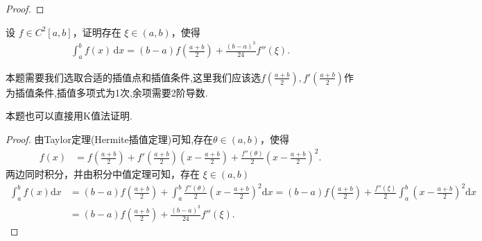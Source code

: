 \documentclass[../../main.tex]{subfiles}%
\begin{document}
\begin{proof}
\end{proof}

\begin{example}
设 $f \in C^2[a, b]$，证明存在 $\xi \in (a, b)$，使得
\begin{align*}
\int_a^b f(x) \, \mathrm{d}x = (b - a) f \left( \frac{a + b}{2} \right) + \frac{(b - a)^3}{24} f''(\xi).
\end{align*}
\end{example}
\begin{note}
本题需要我们选取合适的插值点和插值条件,这里我们应该选$f(\frac{a+b}{2}),f'(\frac{a+b}{2})$作为插值条件,插值多项式为1次,余项需要2阶导数.
\end{note}
\begin{remark}
本题也可以直接用K值法证明.
\end{remark}
\begin{proof}

由Taylor定理(Hermite插值定理)可知,存在$\theta \in \left( a,b \right)$，使得
\begin{align*}
f\left( x \right) &= f\left( \frac{a+b}{2} \right) + f'\left( \frac{a+b}{2} \right) \left( x - \frac{a+b}{2} \right) + \frac{f'' \left( \theta \right)}{2}\left( x - \frac{a+b}{2} \right)^2.
\end{align*}
两边同时积分，并由积分中值定理可知，存在 $\xi \in \left( a,b \right)$
\begin{align*}
\int_a^b{f\left( x \right) \mathrm{d}x} &= \left( b-a \right) f\left( \frac{a+b}{2} \right) + \int_a^b{\frac{f'' \left( \theta \right)}{2}\left( x - \frac{a+b}{2} \right)^2 \mathrm{d}x}
= \left( b-a \right) f\left( \frac{a+b}{2} \right) + \frac{f'' \left( \xi \right)}{2} \int_a^b{\left( x - \frac{a+b}{2} \right)^2 \mathrm{d}x} \\
&= \left( b-a \right) f\left( \frac{a+b}{2} \right) + \frac{\left( b-a \right)^3}{24} f'' \left( \xi \right).
\end{align*}

\end{proof}
\end{document}
